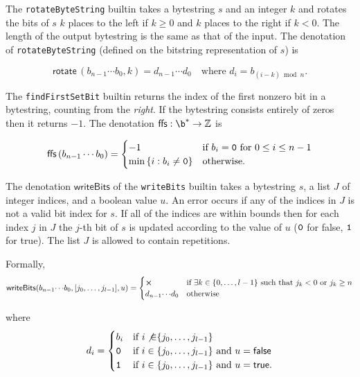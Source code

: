 \label{note:rotate}
The \texttt{rotateByteString} builtin takes a bytestring $s$ and an integer $k$
and rotates the bits of $s$ $k$ places to the left if $k \geq 0$ and $k$ places
to the right if $k < 0$.  The length of the output bytestring is the same as
that of the input.  The denotation of
\texttt{rotateByteString} (defined on the bitstring representation of $s$) is 

$$
\mathsf{rotate}\,(b_{n-1} \cdots b_0, k) = d_{n-1}\cdots d_0 \quad\text{where $d_i = b_{(i-k)\bmod n}$}.
$$

\label{note:ffs}
The \texttt{findFirstSetBit} builtin returns the index of the first nonzero bit
in a bytestring, counting from the \textit{right}. If the bytestring consists
entirely of zeros then it returns $-1$.  The denotation
$\mathsf{ffs}: \b^* \rightarrow \Z$ is

$$
\mathsf{ffs}\,(b_{n-1}\cdots b_0) =
\begin{cases}
  -1 & \text{if $b_i = \mathtt{0}$ for $0 \leq i \leq n-1$}\\
  \min{\{i: b_i \ne \mathtt{0}\}} & \text{otherwise.}
  \end{cases}
$$


\label{note:writebits}
The denotation $\mathsf{writeBits}$ of the \texttt{writeBits} builtin takes a
bytestring $s$, a list $J$ of integer indices, and a boolean value $u$.  An
error occurs if any of the indices in $J$ is not a valid bit index for $s$.  If
all of the indices are within bounds then for each index $j$ in $J$ the $j$-th
bit of $s$ is updated according to the value of $u$ ($\mathtt{0}$
for \textsf{false}, $\mathtt{1}$ for \textsf{true}).  The list $J$ is allowed to
contain repetitions.

\smallskip
\noindent Formally, 
$$
\mathsf{writeBits}(b_{n-1}{\cdots}b_0, [j_0, \ldots, j_{l-1}], u) = 
\begin{cases}
\errorX & \text{if $\exists k \in \{0, \ldots, l-1\}$ such that $j_k < 0$ or $j_k \geq n$} \\
d_{n-1}{\cdots}d_0 & \text{otherwise}
\end{cases}
$$

\noindent where
$$
  d_i =
  \begin{cases}
    b_i & \text{if $i \not{\in} \{j_0, \ldots, j_{l-1}\}$}\\
      \mathtt{0} & \text{if $i \in \{j_0, \ldots, j_{l-1}\}$ and $u = \mathsf{false}$}\\
      \mathtt{1} & \text{if $i \in \{j_0, \ldots, j_{l-1}\}$ and $u = \mathsf{true}$}.
  \end{cases}
$$


